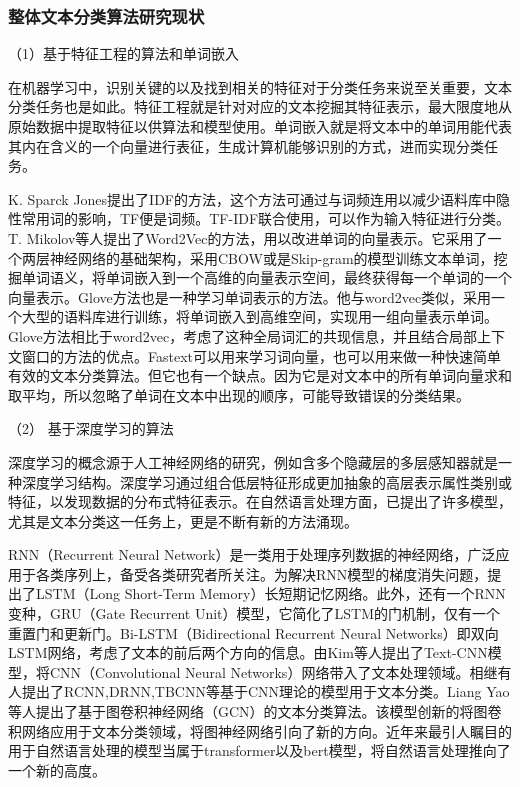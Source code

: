 \subsubsection{整体文本分类算法研究现状}
（1）基于特征工程的算法和单词嵌入

在机器学习中，识别关键的以及找到相关的特征对于分类任务来说至关重要，文本分类任务也是如此。特征工程就是针对对应的文本挖掘其特征表示，最大限度地从原始数据中提取特征以供算法和模型使用。单词嵌入就是将文本中的单词用能代表其内在含义的一个向量进行表征，生成计算机能够识别的方式，进而实现分类任务。

K. Sparck Jones提出了IDF的方法，这个方法可通过与词频连用以减少语料库中隐性常用词的影响，TF便是词频。TF-IDF联合使用，可以作为输入特征进行分类。T. Mikolov等人提出了Word2Vec的方法，用以改进单词的向量表示。它采用了一个两层神经网络的基础架构，采用CBOW或是Skip-gram的模型训练文本单词，挖掘单词语义，将单词嵌入到一个高维的向量表示空间，最终获得每一个单词的一个向量表示。Glove方法也是一种学习单词表示的方法。他与word2vec类似，采用一个大型的语料库进行训练，将单词嵌入到高维空间，实现用一组向量表示单词。Glove方法相比于word2vec，考虑了这种全局词汇的共现信息，并且结合局部上下文窗口的方法的优点。Fastext可以用来学习词向量，也可以用来做一种快速简单有效的文本分类算法。但它也有一个缺点。因为它是对文本中的所有单词向量求和取平均，所以忽略了单词在文本中出现的顺序，可能导致错误的分类结果。

（2） 基于深度学习的算法

深度学习的概念源于人工神经网络的研究，例如含多个隐藏层的多层感知器就是一种深度学习结构。深度学习通过组合低层特征形成更加抽象的高层表示属性类别或特征，以发现数据的分布式特征表示。在自然语言处理方面，已提出了许多模型，尤其是文本分类这一任务上，更是不断有新的方法涌现。

RNN（Recurrent Neural Network）是一类用于处理序列数据的神经网络，广泛应用于各类序列上，备受各类研究者所关注。为解决RNN模型的梯度消失问题，提出了LSTM（Long Short-Term Memory）长短期记忆网络。此外，还有一个RNN变种，GRU（Gate Recurrent Unit）模型，它简化了LSTM的门机制，仅有一个重置门和更新门。Bi-LSTM（Bidirectional Recurrent Neural Networks）即双向LSTM网络，考虑了文本的前后两个方向的信息。由Kim等人提出了Text-CNN模型，将CNN（Convolutional Neural Networks）网络带入了文本处理领域。相继有人提出了RCNN,DRNN,TBCNN等基于CNN理论的模型用于文本分类。Liang Yao等人提出了基于图卷积神经网络（GCN）的文本分类算法。该模型创新的将图卷积网络应用于文本分类领域，将图神经网络引向了新的方向。近年来最引人瞩目的用于自然语言处理的模型当属于transformer以及bert模型，将自然语言处理推向了一个新的高度。

